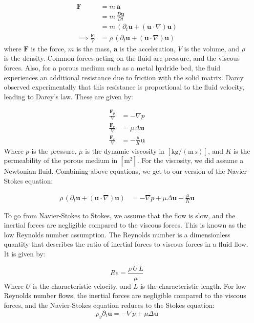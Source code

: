 \begin{align*}
    \mathbf{F} &= m \, \mathbf{a} \\
    &= m \, \frac{D\mathbf{u}}{Dt} \\
    &= m \, (\partial_t \mathbf{u} + (\mathbf{u} \cdot \nabla) \mathbf{u}) \\
    \implies \frac{\mathbf{F}}{V} &= \rho \, (\partial_t \mathbf{u} + (\mathbf{u} \cdot \nabla) \mathbf{u})
\end{align*}
where $\mathbf{F}$ is the force, $m$ is the mass, $\mathbf{a}$ is the acceleration, $V$ is the volume, and $\rho$ is the density. Common forces acting on the fluid are pressure, and the viscous forces. Also, for a porous medium such as a metal hydride bed, the fluid experiences an additional resistance due to friction with the solid matrix. Darcy observed experimentally that this resistance is proportional to the fluid velocity, leading to Darcy's law\cite{Nield2017}. These are given by:

\begin{align*}
    \frac{\mathbf{F}_{p}}{V} &= - \nabla p \\
    \frac{\mathbf{F}_{v}}{V} &= \mu \Delta \mathbf{u} \\
    \frac{\mathbf{F}_{e}}{V} &= - \frac{\mu}{K} \mathbf{u}
\end{align*}
Where $p$ is the pressure, $\mu$ is the dynamic viscosity in $[\mathrm{kg/(m \, s)}]$, and $K$ is the permeability of the porous medium in $[\mathrm{m^2}]$. For the viscosity, we did assume a Newtonian fluid. Combining above equations, we get to our version of the Navier-Stokes equation:

\begin{align}
    \label{eq:phy_navier_stokes}
    \rho \, (\partial_t \mathbf{u} + (\mathbf{u} \cdot \nabla) \mathbf{u}) &= - \nabla p + \mu \Delta \mathbf{u} - \frac{\mu}{K} \mathbf{u}
\end{align}

To go from Navier-Stokes to Stokes, we assume that the flow is slow, and the inertial forces are negligible compared to the viscous forces. This is known as the low Reynolds number assumption. The Reynolds number is a dimensionless quantity that describes the ratio of inertial forces to viscous forces in a fluid flow. It is given by:

\begin{equation}
    Re = \frac{\rho \, U \, L}{\mu}
\end{equation}
Where $U$ is the characteristic velocity, and $L$ is the characteristic length. For low Reynolds number flows, the inertial forces are negligible compared to the viscous forces, and the Navier-Stokes equation reduces to the Stokes equation:
\begin{equation}\label{eq:phy_stokes}
    \rho_g \partial_t \mathbf{u} = - \nabla p + \mu \Delta \mathbf{u}
\end{equation}

